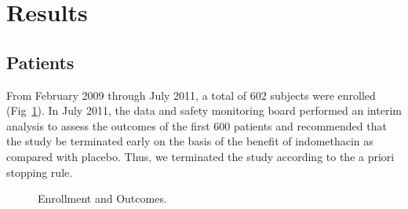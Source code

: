 \documentclass[
  10pt,
  letterpaper,
]{article}
\begin{document}
\section{Results}\label{results}

\subsection{Patients}\label{patients-1}

From February 2009 through July 2011, a total of 602 subjects were
enrolled (Fig~\ref{fig-enrollment-outcomes}). In July 2011, the data and
safety monitoring board performed an interim analysis to assess the
outcomes of the first 600 patients and recommended that the study be
terminated early on the basis of the benefit of indomethacin as compared
with placebo. Thus, we terminated the study according to the a priori
stopping rule.

\begin{figure}[H]


\caption{\label{fig-enrollment-outcomes}Enrollment and Outcomes.}

\end{figure}%
\end{document}
